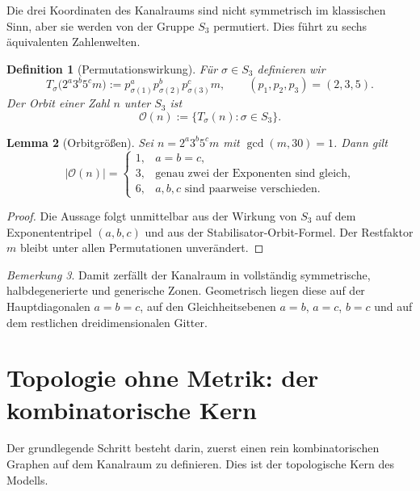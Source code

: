 \documentclass[11pt,a4paper]{article}
\newtheorem{definition}{Definition}[section]
\newtheorem{lemma}[definition]{Lemma}
\theoremstyle{remark}
\newtheorem{bemerkung}[definition]{Bemerkung}
\newcommand{\OO}{\mathcal{O}}
\begin{document}
	Die drei Koordinaten des Kanalraums sind nicht symmetrisch im klassischen Sinn, aber sie werden von der Gruppe $S_3$ permutiert. Dies führt zu sechs äquivalenten Zahlenwelten.
	
	\begin{definition}[Permutationswirkung]
		Für $\sigma\in S_3$ definieren wir
		\begin{equation}
			T_\sigma\bigl(2^a3^b5^cm\bigr):=p_{\sigma(1)}^a p_{\sigma(2)}^b p_{\sigma(3)}^c m,
			\qquad (p_1,p_2,p_3)=(2,3,5).
		\end{equation}
		Der Orbit einer Zahl $n$ unter $S_3$ ist
		\begin{equation}
			\OO(n):=\{T_\sigma(n):\sigma\in S_3\}.
		\end{equation}
	\end{definition}
	
	\begin{lemma}[Orbitgrößen]
		Sei $n=2^a3^b5^cm$ mit $\gcd(m,30)=1$. Dann gilt
		\begin{equation}
			|\OO(n)|=
			\begin{cases}
				1,& a=b=c,\\
				3,& \text{genau zwei der Exponenten sind gleich},\\
				6,& a,b,c\text{ sind paarweise verschieden}.
			\end{cases}
		\end{equation}
	\end{lemma}
	
	\begin{proof}
		Die Aussage folgt unmittelbar aus der Wirkung von $S_3$ auf dem Exponententripel $(a,b,c)$ und aus der Stabilisator-Orbit-Formel. Der Restfaktor $m$ bleibt unter allen Permutationen unverändert.
	\end{proof}
	
	\begin{bemerkung}
		Damit zerfällt der Kanalraum in vollständig symmetrische, halbdegenerierte und generische Zonen. Geometrisch liegen diese auf der Hauptdiagonalen $a=b=c$, auf den Gleichheitsebenen $a=b$, $a=c$, $b=c$ und auf dem restlichen dreidimensionalen Gitter.
	\end{bemerkung}
	
	\section{Topologie ohne Metrik: der kombinatorische Kern}
	
	Der grundlegende Schritt besteht darin, zuerst einen rein kombinatorischen Graphen auf dem Kanalraum zu definieren. Dies ist der topologische Kern des Modells.
	
\end{document}
